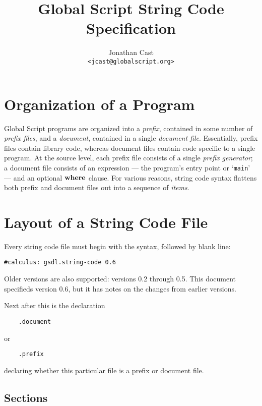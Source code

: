 \documentclass{report}
\title{Global Script String Code Specification}
\author{Jonathan Cast\\\texttt{<jcast@globalscript.org>}}
\newcommand\ccode[1]{\texttt{#1}}
\begin{document}
\maketitle

\tableofcontents

\chapter{Organization of a Program}

Global Script programs are organized into a \emph{prefix},
contained in some number of \emph{prefix files},
 and a \emph{document}, contained in a single \emph{document file}.
Essentially, prefix files contain library code, whereas document files contain code specific to a single program.
At the source level, each prefix file consists of a single \emph{prefix generator};
a document file consists of an expression
--- the program's entry point or `\ccode{main}' ---
and an optional $\mathbf{where}$ clause.
For various reasons, string code syntax flattens both prefix and document files out into a sequence of \emph{items}.

\chapter{Layout of a String Code File}

Every string code file must begin with the syntax, followed by  blank line:
\begin{verbatim}
#calculus: gsdl.string-code 0.6
\end{verbatim}
Older versions are also supported: versions 0.2 through 0.5.
This document specifieds version 0.6, but it has notes on the changes from earlier versions.

Next after this is the declaration
\begin{verbatim}
	.document
\end{verbatim}
or
\begin{verbatim}
	.prefix
\end{verbatim}
declaring whether this particular file is a prefix or document file.

\section{Sections}
\end{document}
